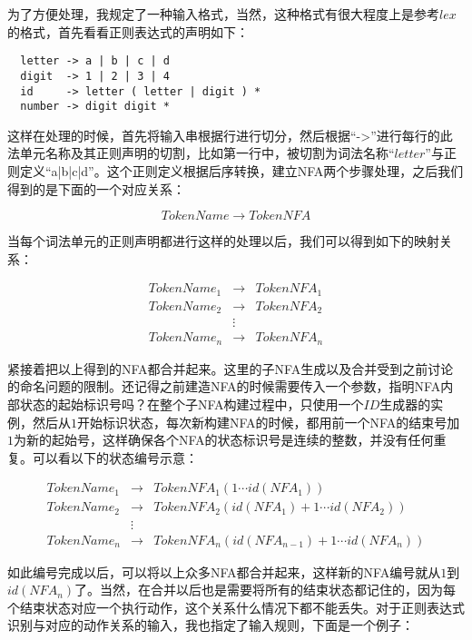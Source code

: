 为了方便处理，我规定了一种输入格式，当然，这种格式有很大程度上是参考$lex$的格式，首先看看正则表达式的声明如下：

\begin{verbatim}
  letter -> a | b | c | d
  digit  -> 1 | 2 | 3 | 4
  id     -> letter ( letter | digit ) *
  number -> digit digit *
\end{verbatim}

这样在处理的时候，首先将输入串根据行进行切分，然后根据“->”进行每行的此法单元名称及其正则声明的切割，比如第一行中，被切割为词法名称“$letter$”与正则定义“a|b|c|d”。这个正则定义根据后序转换，建立NFA两个步骤处理，之后我们得到的是下面的一个对应关系：

\[
    TokenName \rightarrow TokenNFA
\]

当每个词法单元的正则声明都进行这样的处理以后，我们可以得到如下的映射关系：

\begin{eqnarray*}
    TokenName_1 & \rightarrow & TokenNFA_1 \\
    TokenName_2 & \rightarrow & TokenNFA_2 \\
                & \vdots      &            \\
    TokenName_n & \rightarrow & TokenNFA_n 
\end{eqnarray*}

紧接着把以上得到的NFA都合并起来。这里的子NFA生成以及合并受到之前讨论的命名问题的限制。还记得之前建造NFA的时候需要传入一个参数，指明NFA内部状态的起始标识号吗？在整个子NFA构建过程中，只使用一个$ID$生成器的实例，然后从$1$开始标识状态，每次新构建NFA的时候，都用前一个NFA的结束号加$1$为新的起始号，这样确保各个NFA的状态标识号是连续的整数，并没有任何重复。可以看以下的状态编号示意：

\begin{eqnarray*}
    TokenName_1 & \rightarrow & TokenNFA_1 (1\cdots id(NFA_1)) \\
    TokenName_2 & \rightarrow & TokenNFA_2 (id(NFA_1)+1\cdots id(NFA_2)) \\
                & \vdots      &            \\
    TokenName_n & \rightarrow & TokenNFA_n (id(NFA_{n-1})+1\cdots id(NFA_n))
\end{eqnarray*}

如此编号完成以后，可以将以上众多NFA都合并起来，这样新的NFA编号就从$1$到$id(NFA_n)$了。当然，在合并以后也是需要将所有的结束状态都记住的，因为每个结束状态对应一个执行动作，这个关系什么情况下都不能丢失。对于正则表达式识别与对应的动作关系的输入，我也指定了输入规则，下面是一个例子：

